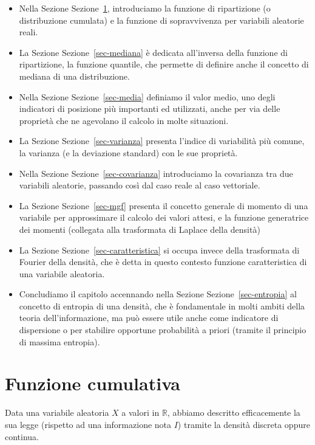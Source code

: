 \documentclass[
  italian,
  letterpaper,
]{book}
\newcommand{\R}{\mathbb{R}}
\theoremstyle{definition}
\theoremstyle{remark}
\begin{document}
\begin{itemize}
\item
  Nella Sezione Sezione~\ref{sec-cdf}, introduciamo la funzione di
  ripartizione (o distribuzione cumulata) e la funzione di sopravvivenza
  per variabili aleatorie reali.
\item
  La Sezione Sezione~\ref{sec-mediana} è dedicata all'inversa della
  funzione di ripartizione, la funzione quantile, che permette di
  definire anche il concetto di mediana di una distribuzione.
\item
  Nella Sezione Sezione~\ref{sec-media} definiamo il valor medio, uno
  degli indicatori di posizione più importanti ed utilizzati, anche per
  via delle proprietà che ne agevolano il calcolo in molte situazioni.
\item
  La Sezione Sezione~\ref{sec-varianza} presenta l'indice di variabilità
  più comune, la varianza (e la deviazione standard) con le sue
  proprietà.
\item
  Nella Sezione Sezione~\ref{sec-covarianza} introduciamo la covarianza
  tra due variabili aleatorie, passando così dal caso reale al caso
  vettoriale.
\item
  La Sezione Sezione~\ref{sec-mgf} presenta il concetto generale di
  momento di una variabile per approssimare il calcolo dei valori
  attesi, e la funzione generatrice dei momenti (collegata alla
  trasformata di Laplace della densità)
\item
  La Sezione Sezione~\ref{sec-caratteristica} si occupa invece della
  trasformata di Fourier della densità, che è detta in questo contesto
  funzione caratteristica di una variabile aleatoria.
\item
  Concludiamo il capitolo accennando nella Sezione
  Sezione~\ref{sec-entropia} al concetto di entropia di una densità, che
  è fondamentale in molti ambiti della teoria dell'informazione, ma può
  essere utile anche come indicatore di dispersione o per stabilire
  opportune probabilità a priori (tramite il principio di massima
  entropia).
\end{itemize}

\section{Funzione cumulativa}\label{sec-cdf}

Data una variabile aleatoria \(X\) a valori in \(\R\), abbiamo descritto
efficacemente la sua legge (rispetto ad una informazione nota \(I\))
tramite la densità discreta oppure continua.
\end{document}
